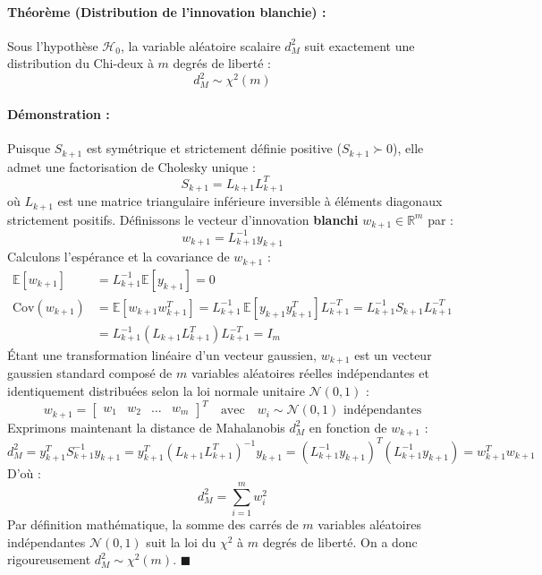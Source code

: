 \documentclass[../Formulations_Kalman.tex]{subfiles}
\begin{document}
\paragraph{Théorème (Distribution de l'innovation blanchie) :}
Sous l'hypothèse $\mathcal{H}_0$, la variable aléatoire scalaire $d_M^2$ suit exactement une distribution du Chi-deux à $m$ degrés de liberté :
\begin{equation}
\boxed{d_M^2 \sim \chi^2(m)}
\end{equation}

\paragraph{Démonstration :}
Puisque $S_{k+1}$ est symétrique et strictement définie positive ($S_{k+1} \succ 0$), elle admet une factorisation de Cholesky unique :
\begin{equation}
S_{k+1} = L_{k+1} L_{k+1}^T
\end{equation}
où $L_{k+1}$ est une matrice triangulaire inférieure inversible à éléments diagonaux strictement positifs. Définissons le vecteur d'innovation \textbf{blanchi} $w_{k+1} \in \mathbb{R}^m$ par :
\begin{equation}
w_{k+1} = L_{k+1}^{-1} y_{k+1}
\end{equation}
Calculons l'espérance et la covariance de $w_{k+1}$ :
\begin{align}
\mathbb{E}[w_{k+1}] &= L_{k+1}^{-1} \mathbb{E}[y_{k+1}] = 0 \\
\text{Cov}(w_{k+1}) &= \mathbb{E}\left[ w_{k+1} w_{k+1}^T \right] = L_{k+1}^{-1} \, \mathbb{E}\left[ y_{k+1} y_{k+1}^T \right] L_{k+1}^{-T} = L_{k+1}^{-1} S_{k+1} L_{k+1}^{-T} \nonumber \\
&= L_{k+1}^{-1} \left( L_{k+1} L_{k+1}^T \right) L_{k+1}^{-T} = I_m
\end{align}
Étant une transformation linéaire d'un vecteur gaussien, $w_{k+1}$ est un vecteur gaussien standard composé de $m$ variables aléatoires réelles indépendantes et identiquement distribuées selon la loi normale unitaire $\mathcal{N}(0, 1)$ :
\begin{equation}
w_{k+1} = \begin{bmatrix} w_1 & w_2 & \dots & w_m \end{bmatrix}^T \quad \text{avec} \quad w_i \sim \mathcal{N}(0, 1) \text{ indépendantes}
\end{equation}
Exprimons maintenant la distance de Mahalanobis $d_M^2$ en fonction de $w_{k+1}$ :
\begin{equation}
d_M^2 = y_{k+1}^T S_{k+1}^{-1} y_{k+1} = y_{k+1}^T \left( L_{k+1} L_{k+1}^T \right)^{-1} y_{k+1} = \left( L_{k+1}^{-1} y_{k+1} \right)^T \left( L_{k+1}^{-1} y_{k+1} \right) = w_{k+1}^T w_{k+1}
\end{equation}
D'où :
\begin{equation}
d_M^2 = \sum_{i=1}^m w_i^2
\end{equation}
Par définition mathématique, la somme des carrés de $m$ variables aléatoires indépendantes $\mathcal{N}(0, 1)$ suit la loi du $\chi^2$ à $m$ degrés de liberté. On a donc rigoureusement $d_M^2 \sim \chi^2(m)$. $\blacksquare$
\end{document}
